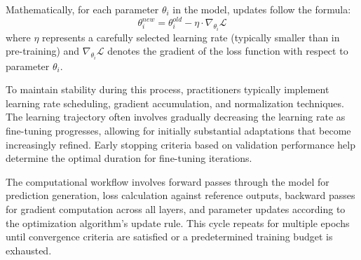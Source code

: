 \vspace{0.5cm}

Mathematically, for each parameter $\theta_i$ in the model, updates follow the formula:
\begin{equation}
\theta_i^{new} = \theta_i^{old} - \eta \cdot \nabla_{\theta_i} \mathcal{L}
\end{equation}
where $\eta$ represents a carefully selected learning rate (typically smaller than in pre-training) and $\nabla_{\theta_i} \mathcal{L}$ denotes the gradient of the loss function with respect to parameter $\theta_i$.

\vspace{0.5cm}

To maintain stability during this process, practitioners typically implement learning rate scheduling, gradient accumulation, and normalization techniques. The learning trajectory often involves gradually decreasing the learning rate as fine-tuning progresses, allowing for initially substantial adaptations that become increasingly refined. Early stopping criteria based on validation performance help determine the optimal duration for fine-tuning iterations.

\vspace{0.5cm}

The computational workflow involves forward passes through the model for prediction generation, loss calculation against reference outputs, backward passes for gradient computation across all layers, and parameter updates according to the optimization algorithm's update rule. This cycle repeats for multiple epochs until convergence criteria are satisfied or a predetermined training budget is exhausted.

\vspace{0.5cm}

